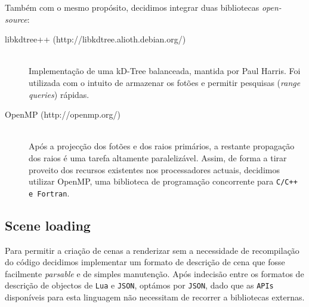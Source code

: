 \documentclass[a4paper]{article}
\begin{document}
\indent Também com o mesmo propósito, decidimos integrar duas bibliotecas \emph{open-source}:

\begin{description}
	\item[libkdtree++ (http://libkdtree.alioth.debian.org/)] \hfill \\
		Implementação de uma kD-Tree balanceada, mantida por Paul Harris.
		Foi utilizada com o intuito	de armazenar os fotões e permitir pesquisas (\emph{range queries}) rápidas.
	\item[OpenMP (http://openmp.org/)] \hfill \\
		Após a projecção dos fotões e dos raios primários, a restante propagação dos raios é uma tarefa altamente paralelizável.
		Assim, de forma a tirar proveito dos recursos existentes nos processadores actuais, decidimos utilizar OpenMP, uma biblioteca
		de programação concorrente para \texttt{C/C++ e Fortran}.
\end{description}

\subsection{Scene loading}
\indent \indent Para permitir a criação de cenas a renderizar sem a necessidade de recompilação do código decidimos implementar um formato de descrição
de cena que fosse facilmente \emph{parsable} e de simples manutenção. Após indecisão entre os formatos de descrição de objectos de \texttt{Lua} e \texttt{JSON},
optámos por \texttt{JSON}, dado que as \texttt{APIs} disponíveis para esta linguagem não necessitam de recorrer a bibliotecas externas.
\end{document}
